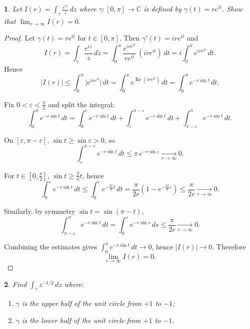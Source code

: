 \documentclass[12pt, a4paper]{report}
\theoremstyle{spaced}
\newtheorem{exercise}{}
\newcommand{\setexercise}[1]{\setcounter{exercise}{#1-1}}
\begin{document}
\setexercise{12}
\begin{exercise}
	Let $I(r)=\displaystyle\int_{\gamma}\frac{e^{iz}}{z}\,dz$ where $\gamma:[0,\pi]\to\mathbb{C}$ is defined by $\gamma(t)=re^{it}$. Show that $\displaystyle\lim_{r\to\infty} I(r)=0$.
\end{exercise}


\begin{proof}
	Let $\gamma(t)=r e^{it}$ for $t\in[0,\pi]$. Then $\gamma'(t)=i r e^{it}$ and
	\[
		I(r)=\int_{\gamma}\frac{e^{iz}}{z}\,dz
		=\int_0^\pi \frac{e^{i r e^{it}}}{r e^{it}}\,(i r e^{it})\,dt
		= i\int_0^\pi e^{i r e^{it}}\,dt.
	\]
	Hence
	\[
		|I(r)|\le \int_0^\pi \bigl|e^{i r e^{it}}\bigr|\,dt
		=\int_0^\pi e^{\operatorname{Re}(i r e^{it})}\,dt
		=\int_0^\pi e^{-r\sin t}\,dt.
	\]

	Fix $0<\varepsilon<\frac{\pi}{2}$ and split the integral:
	\[
		\int_0^\pi e^{-r\sin t}\,dt
		=\int_0^\varepsilon e^{-r\sin t}\,dt
		+\int_\varepsilon^{\pi-\varepsilon} e^{-r\sin t}\,dt
		+\int_{\pi-\varepsilon}^{\pi} e^{-r\sin t}\,dt.
	\]

	On $[\varepsilon,\pi-\varepsilon]$, $\sin t\ge \sin\varepsilon>0$, so
	\[
		\int_\varepsilon^{\pi-\varepsilon} e^{-r\sin t}\,dt
		\le \pi\, e^{-r\sin\varepsilon}
		\xrightarrow[r\to\infty]{}0.
	\]

	For $t\in[0,\frac{\pi}{2}]$, $\sin t\ge \frac{2}{\pi}t$, hence
	\[
		\int_0^\varepsilon e^{-r\sin t}\,dt
		\le \int_0^\varepsilon e^{-\frac{2r}{\pi}t}\,dt
		= \frac{\pi}{2r}\!\left(1-e^{-\frac{2r}{\pi}\varepsilon}\right)
		\le \frac{\pi}{2r}
		\xrightarrow[r\to\infty]{}0.
	\]

	Similarly, by symmetry $\sin t=\sin(\pi-t)$,
	\[
		\int_{\pi-\varepsilon}^{\pi} e^{-r\sin t}\,dt
		= \int_0^\varepsilon e^{-r\sin s}\,ds
		\le \frac{\pi}{2r}
		\xrightarrow[r\to\infty]{}0.
	\]

	Combining the estimates gives $\int_0^\pi e^{-r\sin t}\,dt \to 0$, hence
	$|I(r)|\to 0$. Therefore
	\[
		\lim_{r\to\infty} I(r)=0.
	\]
\end{proof}

\setexercise{13}
\begin{exercise}
	Find $\displaystyle\int_{\gamma} z^{-1/2}\,dz$ where:
	\begin{enumerate}\itemsep0pt
		\item[(a)] $\gamma$ is the upper half of the unit circle from $+1$ to $-1$;
		\item[(b)] $\gamma$ is the lower half of the unit circle from $+1$ to $-1$.
	\end{enumerate}
\end{exercise}
\end{document}
